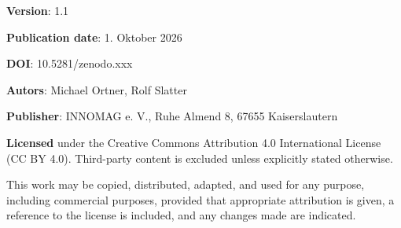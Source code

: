\cleardoublepage
\thispagestyle{empty}

\textbf{Version}: 1.1

\textbf{Publication date}: 1. Oktober 2026

\textbf{DOI}: 10.5281/zenodo.xxx
\vspace{1.0cm}

\textbf{Autors}: Michael Ortner, Rolf Slatter

\textbf{Publisher}: INNOMAG e. V., Ruhe Almend 8, 67655 Kaiserslautern
\vspace{1.0cm}

\textbf{Licensed} under the Creative Commons Attribution 4.0 International License (CC BY 4.0). Third-party content is excluded unless explicitly stated otherwise.

This work may be copied, distributed, adapted, and used for any purpose, including commercial purposes, provided that appropriate attribution is given, a reference to the license is included, and any changes made are indicated.

\cleardoublepage